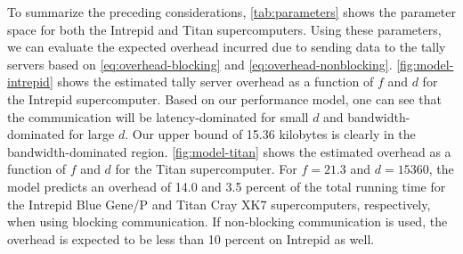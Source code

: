 To summarize the preceding considerations, \autoref{tab:parameters} shows the
parameter space for both the Intrepid and Titan supercomputers. Using these
parameters, we can evaluate the expected overhead incurred due to sending data
to the tally servers based on \eqref{eq:overhead-blocking} and
\eqref{eq:overhead-nonblocking}. \autoref{fig:model-intrepid} shows the
estimated tally server overhead as a function of $f$ and $d$ for the Intrepid
supercomputer. Based on our performance model, one can see that the
communication will be latency-dominated for small $d$ and bandwidth-dominated
for large $d$. Our upper bound of 15.36 kilobytes is clearly in the
bandwidth-dominated region. \autoref{fig:model-titan} shows the estimated
overhead as a function of $f$ and $d$ for the Titan supercomputer. For $f =
21.3$ and $d = 15360$, the model predicts an overhead of 14.0 and 3.5 percent of
the total running time for the Intrepid Blue Gene/P and Titan Cray XK7
supercomputers, respectively, when using blocking communication. If non-blocking
communication is used, the overhead is expected to be less than 10 percent on
Intrepid as well.

\begin{table}[htb]
\end{table}

